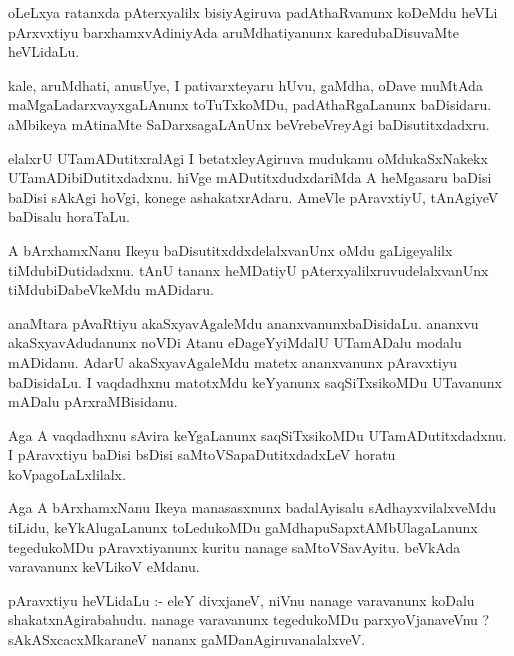\documentclass{article}
\begin{document}
\begin{mn}
oLeLxya  ratanxda  pAterxyalilx  bisiyAgiruva  padAthaRvanunx  koDeMdu  heVLi  pArxvxtiyu  barxhamxvAdiniyAda  
aruMdhatiyanunx  karedubaDisuvaMte  heVLidaLu.
\end{mn}

\begin{mn}
kale,  aruMdhati,  anusUye,  I  pativarxteyaru  hUvu,  gaMdha,  oDave  muMtAda  maMgaLadarxvayxgaLAnunx  
toTuTxkoMDu,  padAthaRgaLanunx  baDisidaru.  aMbikeya  mAtinaMte  SaDarxsagaLAnUnx  beVrebeVreyAgi  baDisutitxdadxru.
\end{mn}

\begin{mn}
elalxrU  UTamADutitxralAgi  I  betatxleyAgiruva  mudukanu  oMdukaSxNakekx  UTamADibiDutitxdadxnu.  hiVge  mADutitxdudxdariMda  
A  heMgasaru  baDisi  baDisi  sAkAgi  hoVgi,  konege  ashakatxrAdaru.  AmeVle  pAravxtiyU,  tAnAgiyeV  baDisalu  horaTaLu.
\end{mn}

\begin{mn}
A  bArxhamxNanu  Ikeyu  baDisutitxddxdelalxvanUnx  oMdu  gaLigeyalilx  tiMdubiDutidadxnu.  tAnU  tananx  
heMDatiyU  pAterxyalilxruvudelalxvanUnx  tiMdubiDabeVkeMdu  mADidaru.
\end{mn}

\begin{mn}
anaMtara  pAvaRtiyu  akaSxyavAgaleMdu  ananxvanunxbaDisidaLu.  ananxvu  akaSxyavAdudanunx  noVDi  Atanu  
eDageYyiMdalU  UTamADalu  modalu  mADidanu.  AdarU  akaSxyavAgaleMdu  matetx  ananxvanunx  pAravxtiyu  
baDisidaLu.  I  vaqdadhxnu  matotxMdu  keYyanunx  saqSiTxsikoMDu  UTavanunx  mADalu  pArxraMBisidanu.
\end{mn}

\begin{mn}
Aga  A  vaqdadhxnu  sAvira  keYgaLanunx  saqSiTxsikoMDu  UTamADutitxdadxnu.  I  pAravxtiyu  baDisi  bsDisi  
saMtoVSapaDutitxdadxLeV  horatu  koVpagoLaLxlilalx.
\end{mn}

\begin{mn}
Aga  A  bArxhamxNanu  Ikeya  manasasxnunx  badalAyisalu  sAdhayxvilalxveMdu  tiLidu,  keYkAlugaLanunx  
toLedukoMDu  gaMdhapuSapxtAMbUlagaLanunx  tegedukoMDu  pAravxtiyanunx  kuritu  nanage  saMtoVSavAyitu.  
beVkAda  varavanunx  keVLikoV  eMdanu.
\end{mn}

\begin{mn}
pAravxtiyu  heVLidaLu :-  eleY  divxjaneV,  niVnu  nanage  varavanunx  koDalu  shakatxnAgirabahudu.  
nanage  varavanunx  tegedukoMDu  parxyoVjanaveVnu ?  sAkASxcacxMkaraneV  nananx  gaMDanAgiruvanalalxveV.
\end{mn}
\end{document}
